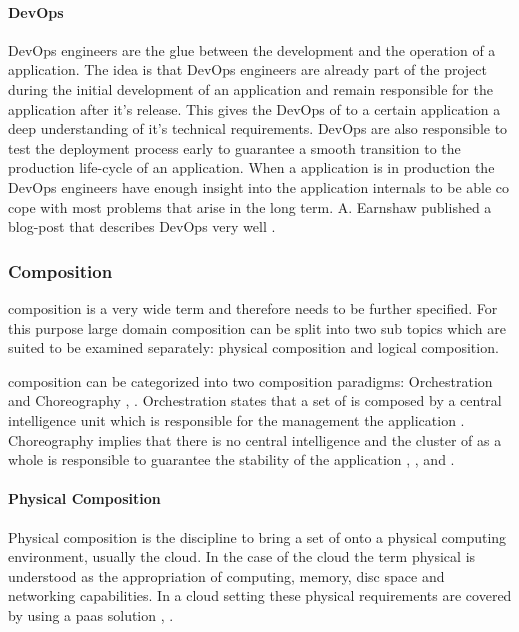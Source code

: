 \paragraph{DevOps}

DevOps engineers are the glue between the development and the operation of a
\ms{} application. The idea is that DevOps engineers are already part of the
project during the initial development of an application and remain responsible
for the application after it's release. This gives the DevOps of to a certain
application a deep understanding of it's technical requirements. DevOps are also
responsible to test the deployment process early to guarantee a smooth
transition to the production life-cycle of an application. When a \ms{}
application is in production the DevOps engineers have enough insight into the
application internals to be able co cope with most problems that arise in the
long term. A. Earnshaw published a blog-post that describes DevOps very
well \cite{earnshaw2013devops}.

\subsubsection{\ms{} Composition}
\label{subsub:composition}

\ms{} composition is a very wide term and therefore needs to be further
specified. For this purpose large domain composition can be split into two sub
topics which are suited to be examined separately: physical composition and
logical composition.

\ms{} composition can be categorized into two composition paradigms:
Orchestration and Choreography \cite{varjoinen2014orchestrationVSchoreography},
\cite{lublinsky2008orchestrationVSchoreography}. Orchestration states that a set
of \mss{} is composed by a central intelligence unit which is responsible for
the management the application \cite{cohen2015orchestration}. Choreography
implies that there is no central intelligence and the cluster of \mss{} as a
whole is responsible to guarantee the stability of the application
\cite{millidge2015choreography}, \cite{vilas2016choreography}, and
\cite{jellema2017choreography}.

\paragraph{Physical Composition}

Physical composition is the discipline to bring a set of \mss{} onto a
physical computing environment, usually the cloud. In the case of the cloud the
term physical is understood as the appropriation of computing, memory, disc
space and networking capabilities. In a cloud setting these physical
requirements are covered by using a \gls{paas} solution
\cite{lawton2008developing}, \cite{buyya2009modeling}.

